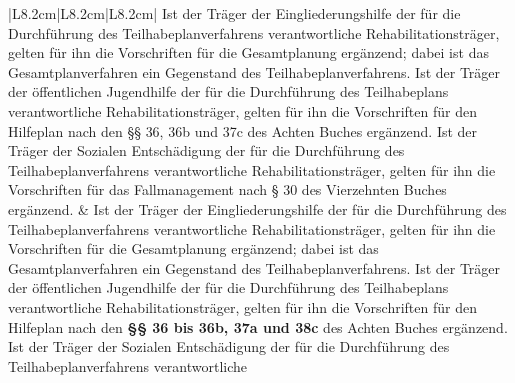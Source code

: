 \documentclass[10pt,a4paper,landscape]{article}
\begin{document}
\begin{longtable}{|L{8.2cm}|L{8.2cm}|L{8.2cm}|}
Ist der Träger der Eingliederungshilfe der  \newline für die Durchführung des  \newline Teilhabeplanverfahrens verantwortliche  \newline Rehabilitationsträger, gelten für ihn die  \newline Vorschriften für die Gesamtplanung  \newline ergänzend; dabei ist das  \newline Gesamtplanverfahren ein Gegenstand des  \newline Teilhabeplanverfahrens. Ist der Träger der  \newline öffentlichen Jugendhilfe der für die  \newline Durchführung des Teilhabeplans  \newline verantwortliche Rehabilitationsträger,  \newline gelten für ihn die Vorschriften für den  \newline Hilfeplan nach den \S{}\S{} \textcolor{diffred}{36, 36b} und \textcolor{diffred}{37c} des  \newline Achten Buches ergänzend. Ist der Träger  \newline der Sozialen Entschädigung der für die  \newline Durchführung des Teilhabeplanverfahrens  \newline verantwortliche Rehabilitationsträger,  \newline gelten für ihn die Vorschriften für das  \newline Fallmanagement nach \S{} 30 des  \newline Vierzehnten Buches ergänzend. & Ist der Träger der Eingliederungshilfe der  \newline für die Durchführung des  \newline Teilhabeplanverfahrens verantwortliche  \newline Rehabilitationsträger, gelten für ihn die  \newline Vorschriften für die Gesamtplanung  \newline ergänzend; dabei ist das  \newline Gesamtplanverfahren ein Gegenstand des  \newline Teilhabeplanverfahrens. Ist der Träger der  \newline öffentlichen Jugendhilfe der für die  \newline Durchführung des Teilhabeplans  \newline verantwortliche Rehabilitationsträger,  \newline gelten für ihn die Vorschriften für den  \newline Hilfeplan nach den \textbf{\S{}\S{} 36 bis 36b, 37a und  \newline 38c} des Achten Buches ergänzend. Ist der  \newline Träger der Sozialen Entschädigung der für  \newline die Durchführung des  \newline Teilhabeplanverfahrens verantwortliche  \newline 
\end{longtable}
\end{document}
